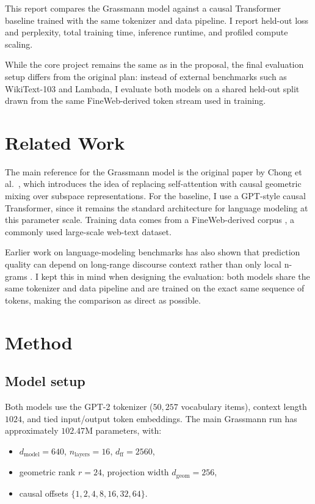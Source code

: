 \documentclass{article}
\begin{document}
This report compares the Grassmann model against a causal Transformer baseline trained with the same tokenizer and data pipeline. I report held-out loss and perplexity, total training time, inference runtime, and profiled compute scaling.

While the core project remains the same as in the proposal, the final evaluation setup differs from the original plan: instead of external benchmarks such as WikiText-103 and Lambada, I evaluate both models on a shared held-out split drawn from the same FineWeb-derived token stream used in training.

\section{Related Work}

The main reference for the Grassmann model is the original paper by Chong et al.\ \cite{chong2025attentionneed}, which introduces the idea of replacing self-attention with causal geometric mixing over subspace representations. For the baseline, I use a GPT-style causal Transformer, since it remains the standard architecture for language modeling at this parameter scale. Training data comes from a FineWeb-derived corpus \cite{penedo2024the}, a commonly used large-scale web-text dataset.

Earlier work on language-modeling benchmarks has also shown that prediction quality can depend on long-range discourse context rather than only local n-grams \cite{paperno2016lambadadatasetwordprediction}. I kept this in mind when designing the evaluation: both models share the same tokenizer and data pipeline and are trained on the exact same sequence of tokens, making the comparison as direct as possible.
\section{Method}

\subsection{Model setup}
Both models use the GPT-2 tokenizer (\(50{,}257\) vocabulary items), context length \(1024\), and tied input/output token embeddings. The main Grassmann run has approximately \(102.47\)M parameters, with:
\begin{itemize}
    \item \(d_{\text{model}}=640\), \(n_{\text{layers}}=16\), \(d_{\text{ff}}=2560\),
    \item geometric rank \(r=24\), projection width \(d_{\text{geom}}=256\),
    \item causal offsets \(\{1,2,4,8,16,32,64\}\).
\end{itemize}
\end{document}
